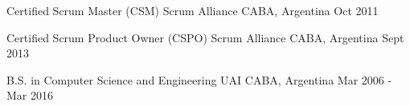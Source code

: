 
\begin{cventries}

  \cventry
    {Certified Scrum Master (CSM)} %
    {Scrum Alliance} %
    {CABA, Argentina} %
    {Oct 2011} %
    {}
    
  \cventry
    {Certified Scrum Product Owner (CSPO)} %
    {Scrum Alliance} %
    {CABA, Argentina} %
    {Sept 2013} %
    {}
    
  \cventry
    {B.S. in Computer Science and Engineering} %
    {UAI} %
    {CABA, Argentina} %
    {Mar 2006 - Mar 2016} %
    {}

\end{cventries}
